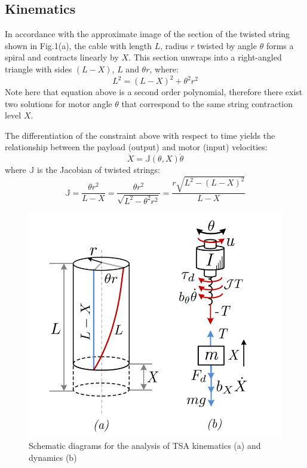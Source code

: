 \subsection{Kinematics}
    In accordance with the approximate image of the section of the twisted string shown in Fig.1(a), the cable with length $L$, radius $r$ twisted by angle $\theta$ forms a spiral and contracts linearly by $X$.
    This section unwraps into a right-angled triangle with sides $(L-X)$, $L$ and $\theta r$, where: 
    \begin{equation}
        L^2 = (L-X)^2 + \theta^2r^2
    \end{equation}
    Note here that equation above is a second order polynomial, therefore there exist two solutions for motor angle $\theta$ that correspond to the same string contraction level $X$.

    The differentiation of the constraint above with respect to time yields the relationship between the payload (output) and motor (input) velocities:
    \begin{equation}
        \dot X = \mathbb{J}(\theta, X) \dot \theta
    \end{equation}
    where $\mathbb{J}$ is the Jacobian of twisted strings:
    \begin{equation}
        \mathbb{J} = \frac{\theta r^2}{L-X} = \frac{\theta r^2}{\sqrt{L^2 - \theta^2 r^2}} = \frac{r\sqrt{L^2 - (L-X)^2}}{L-X}
    \end{equation}

    \begin{figure}
        \centering
        \includegraphics[width=0.6\linewidth]{figs/schematic_model.png}
        \caption{Schematic diagrams for the analysis of TSA kinematics (a) and dynamics (b)}
        \label{fig:tsa_diagram}
    \end{figure}


